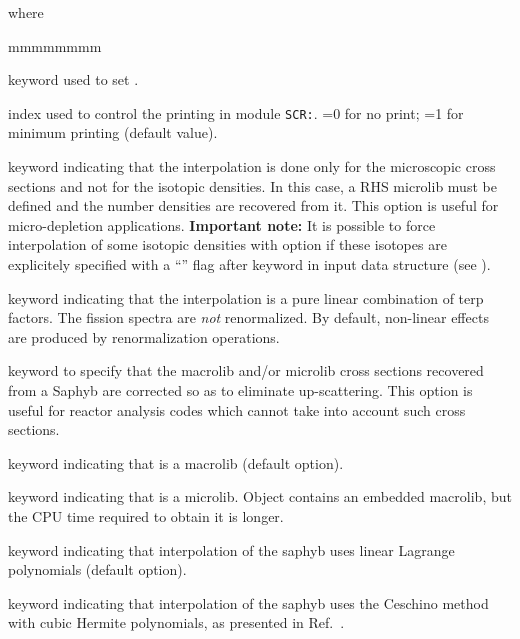 \noindent where
\begin{ListeDeDescription}{mmmmmmmm}

\item[\moc{EDIT}] keyword used to set .

\item[\dusa{iprint}] index used to control the printing in module {\tt SCR:}. =0 for no print; =1 for minimum printing (default value).
 
\item[\moc{RES}] keyword indicating that the interpolation is done only for the microscopic cross sections and not for the isotopic densities. In this case, a RHS {\sc microlib} must be defined and the number densities are recovered from it. This option is useful for micro-depletion applications. {\bf Important note:} It is possible to force interpolation of some isotopic densities with  option if these
isotopes are explicitely specified with a ``\moc{*}'' flag after  keyword in  input data structure (see ).

\item[\moc{PURE}] keyword indicating that the interpolation is a pure linear combination of terp factors. The fission spectra are {\sl not}
renormalized. By default, non-linear effects are produced by renormalization operations.

\item[\moc{UPS}] keyword to specify that the macrolib and/or microlib cross sections recovered from a Saphyb are
corrected so as to eliminate up-scattering. This option is useful for reactor analysis codes which cannot
take into account such cross sections.

\item[\moc{MACRO}] keyword indicating that  is a {\sc macrolib} (default option).

\item[\moc{MICRO}] keyword indicating that  is a {\sc microlib}. Object  contains an embedded {\sc macrolib}, but the CPU time required to obtain it is longer.

\item[\moc{LINEAR}] keyword indicating that interpolation of the {\sc saphyb} uses linear Lagrange polynomials (default option).

\item[\moc{CUBIC}] keyword indicating that interpolation of the {\sc saphyb} uses the Ceschino method
with cubic Hermite polynomials, as presented in Ref.~.


\end{ListeDeDescription}
